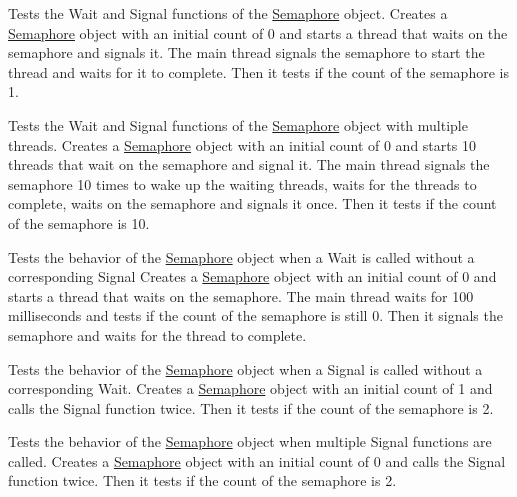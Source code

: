 \begin{DoxyRefList}
%
Tests the Wait and Signal functions of the \mbox{\hyperlink{classSemaphore}{Semaphore}} object. Creates a \mbox{\hyperlink{classSemaphore}{Semaphore}} object with an initial count of 0 and starts a thread that waits on the semaphore and signals it. The main thread signals the semaphore to start the thread and waits for it to complete. Then it tests if the count of the semaphore is 1.  
\item[Member \mbox{\hyperlink{semaphore_8test_8cc_a839989411f5a2147cd64bdba9fa27905}{TEST}} (Semaphore\+Test, Multiple\+Wait\+Signal)]\label{test__test000011}%
%
Tests the Wait and Signal functions of the \mbox{\hyperlink{classSemaphore}{Semaphore}} object with multiple threads. Creates a \mbox{\hyperlink{classSemaphore}{Semaphore}} object with an initial count of 0 and starts 10 threads that wait on the semaphore and signal it. The main thread signals the semaphore 10 times to wake up the waiting threads, waits for the threads to complete, waits on the semaphore and signals it once. Then it tests if the count of the semaphore is 10.  
\item[Member \mbox{\hyperlink{semaphore_8test_8cc_a649c78316d8d2c3dc73d84ce5d5f712b}{TEST}} (Semaphore\+Test, Wait\+Without\+Signal)]\label{test__test000012}%
%
Tests the behavior of the \mbox{\hyperlink{classSemaphore}{Semaphore}} object when a Wait is called without a corresponding Signal Creates a \mbox{\hyperlink{classSemaphore}{Semaphore}} object with an initial count of 0 and starts a thread that waits on the semaphore. The main thread waits for 100 milliseconds and tests if the count of the semaphore is still 0. Then it signals the semaphore and waits for the thread to complete.  
\item[Member \mbox{\hyperlink{semaphore_8test_8cc_aed489802850a894442116035cc6fd450}{TEST}} (Semaphore\+Test, Signal\+Without\+Wait)]\label{test__test000013}%
%
Tests the behavior of the \mbox{\hyperlink{classSemaphore}{Semaphore}} object when a Signal is called without a corresponding Wait. Creates a \mbox{\hyperlink{classSemaphore}{Semaphore}} object with an initial count of 1 and calls the Signal function twice. Then it tests if the count of the semaphore is 2.  
\item[Member \mbox{\hyperlink{semaphore_8test_8cc_a4d28b210dd621384af9d457f3399b68c}{TEST}} (Semaphore\+Test, Multiple\+Signal)]\label{test__test000014}%
%
Tests the behavior of the \mbox{\hyperlink{classSemaphore}{Semaphore}} object when multiple Signal functions are called. Creates a \mbox{\hyperlink{classSemaphore}{Semaphore}} object with an initial count of 0 and calls the Signal function twice. Then it tests if the count of the semaphore is 2. 
\end{DoxyRefList}